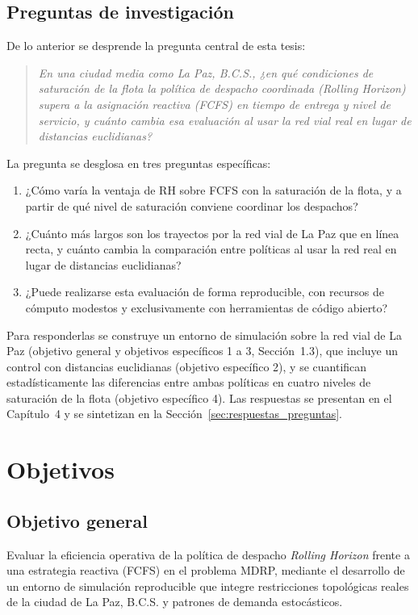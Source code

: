 \documentclass[12pt,letterpaper,oneside]{book}
\begin{document}
\subsection{Preguntas de investigación}
\label{sec:preguntas}
De lo anterior se desprende la pregunta central de esta tesis:

\begin{quote}
\textit{En una ciudad media como La Paz, B.C.S., ¿en qué condiciones de saturación de la flota la
política de despacho coordinada (\textit{Rolling Horizon}) supera a la asignación reactiva (FCFS)
en tiempo de entrega y nivel de servicio, y cuánto cambia esa evaluación al usar la red vial real
en lugar de distancias euclidianas?}
\end{quote}

\noindent La pregunta se desglosa en tres preguntas específicas:

\begin{enumerate}
	\item[\textbf{PI1.}] ¿Cómo varía la ventaja de RH sobre FCFS con la saturación de la flota, y a
	partir de qué nivel de saturación conviene coordinar los despachos?
	\item[\textbf{PI2.}] ¿Cuánto más largos son los trayectos por la red vial de La Paz que en línea
	recta, y cuánto cambia la comparación entre políticas al usar la red real en lugar de distancias
	euclidianas?
	\item[\textbf{PI3.}] ¿Puede realizarse esta evaluación de forma reproducible, con recursos de
	cómputo modestos y exclusivamente con herramientas de código abierto?
\end{enumerate}

Para responderlas se construye un entorno de simulación sobre la red vial de La Paz (objetivo
general y objetivos específicos 1 a 3, Sección~1.3), que incluye un control con distancias
euclidianas (objetivo específico 2), y se cuantifican estadísticamente las diferencias entre ambas
políticas en cuatro niveles de saturación de la flota (objetivo específico 4).  Las respuestas se
presentan en el Capítulo~4 y se sintetizan en la Sección~\ref{sec:respuestas_preguntas}.

\section{Objetivos}

\subsection{Objetivo general}
Evaluar la eficiencia operativa de la política de despacho \textit{Rolling Horizon} frente a una estrategia 
reactiva (FCFS) en el problema MDRP, mediante el desarrollo de un entorno de simulación reproducible que integre 
restricciones topológicas reales de la ciudad de La Paz, B.C.S. y patrones de demanda estocásticos.
\end{document}
